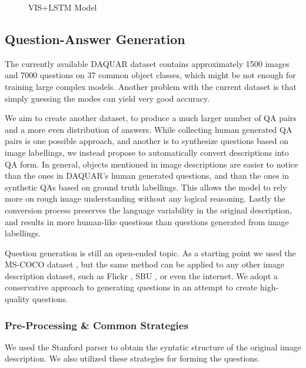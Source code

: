 \documentclass{article} %
\renewcommand{\#}[1]{\textbf{#1}}
\begin{document}
\begin{figure}
\centering
\scalebox{0.6}{
}
\caption{VIS+LSTM Model}
\label{fig:imgword}
\end{figure}

\subsection{Question-Answer Generation}

The currently available DAQUAR dataset contains approximately 1500 images and
7000 questions on 37 common object classes, which might be not enough for
training large complex models. Another problem with the current dataset is that
simply guessing the modes can yield very good accuracy.

We aim to create another dataset, to produce a much larger number of QA pairs
and a more even distribution of answers. While collecting human generated QA
pairs is one possible approach, and another is to synthesize questions based on
image labellings, we instead propose to automatically convert descriptions
into QA form.  In general, objects mentioned in image descriptions are easier
to notice than the ones in DAQUAR's human generated  questions, and than the
ones in synthetic QAs based on ground truth labellings.  This allows the  model
to rely more on rough image understanding without any  logical reasoning.
Lastly the conversion process preserves the language variability  in the
original description, and results in more human-like questions than  questions
generated from image labellings.

Question generation is still an open-ended topic. As a starting point we used
the MS-COCO dataset \cite{mscoco}, but the same method can be applied to any
other image description dataset, such as Flickr \cite{flickr8k}, SBU
\cite{ordonez11}, or even the internet.  We adopt a conservative approach to
generating questions in an attempt to create high-quality questions.

\subsubsection{Pre-Processing \& Common Strategies}

We used the Stanford parser \cite{klein03} to obtain the syntatic structure  of
the original image description. We also utilized these strategies for forming
the questions.
\end{document}

